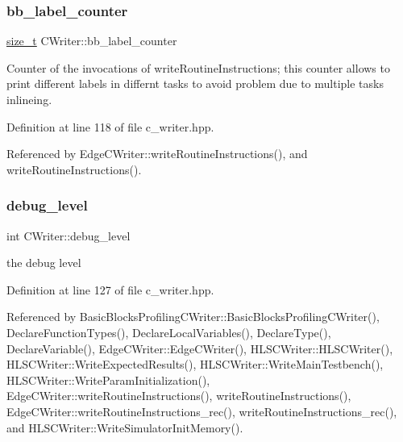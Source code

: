 \mbox{\label{classCWriter_aed289d777116058d00df6f2d46430fb4}} 
\subsubsection{\texorpdfstring{bb\+\_\+label\+\_\+counter}{bb\_label\_counter}}
{\footnotesize\ttfamily \hyperlink{tutorial__fpt__2017_2intro_2sixth_2test_8c_a7c94ea6f8948649f8d181ae55911eeaf}{size\+\_\+t} C\+Writer\+::bb\+\_\+label\+\_\+counter\hspace{0.3cm}{\ttfamily [protected]}}



Counter of the invocations of write\+Routine\+Instructions; this counter allows to print different labels in differnt tasks to avoid problem due to multiple tasks inlineing. 



Definition at line 118 of file c\+\_\+writer.\+hpp.



Referenced by Edge\+C\+Writer\+::write\+Routine\+Instructions(), and write\+Routine\+Instructions().

\mbox{\label{classCWriter_a7f6d9454ff1aff00ebb5b97877f13dfd}} 
\subsubsection{\texorpdfstring{debug\+\_\+level}{debug\_level}}
{\footnotesize\ttfamily int C\+Writer\+::debug\+\_\+level\hspace{0.3cm}{\ttfamily [protected]}}



the debug level 



Definition at line 127 of file c\+\_\+writer.\+hpp.



Referenced by Basic\+Blocks\+Profiling\+C\+Writer\+::\+Basic\+Blocks\+Profiling\+C\+Writer(), Declare\+Function\+Types(), Declare\+Local\+Variables(), Declare\+Type(), Declare\+Variable(), Edge\+C\+Writer\+::\+Edge\+C\+Writer(), H\+L\+S\+C\+Writer\+::\+H\+L\+S\+C\+Writer(), H\+L\+S\+C\+Writer\+::\+Write\+Expected\+Results(), H\+L\+S\+C\+Writer\+::\+Write\+Main\+Testbench(), H\+L\+S\+C\+Writer\+::\+Write\+Param\+Initialization(), Edge\+C\+Writer\+::write\+Routine\+Instructions(), write\+Routine\+Instructions(), Edge\+C\+Writer\+::write\+Routine\+Instructions\+\_\+rec(), write\+Routine\+Instructions\+\_\+rec(), and H\+L\+S\+C\+Writer\+::\+Write\+Simulator\+Init\+Memory().

